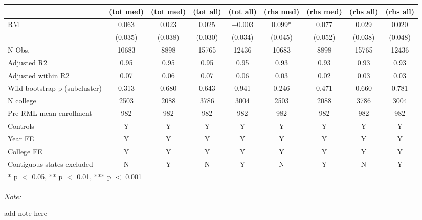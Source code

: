 \begin{table}
\centering
\begin{threeparttable}
\begin{tabular}[t]{lcccccccc}
\toprule
  & (tot med) & (tot med)  & (tot all) & (tot all)  & (rhs med) & (rhs med)  & (rhs all) & (rhs all) \\
\midrule
RM & \num{0.063} & \num{0.023} & \num{0.025} & \num{-0.003} & \num{0.099}* & \num{0.077} & \num{0.029} & \num{0.020}\\
 & (\num{0.035}) & (\num{0.038}) & (\num{0.030}) & (\num{0.034}) & (\num{0.045}) & (\num{0.052}) & (\num{0.038}) & (\num{0.048})\\
\midrule
N Obs. & \num{10683} & \num{8898} & \num{15765} & \num{12436} & \num{10683} & \num{8898} & \num{15765} & \num{12436}\\
Adjusted R2 & \num{0.95} & \num{0.95} & \num{0.95} & \num{0.95} & \num{0.93} & \num{0.93} & \num{0.93} & \num{0.93}\\
Adjusted within R2 & \num{0.07} & \num{0.06} & \num{0.07} & \num{0.06} & \num{0.03} & \num{0.02} & \num{0.03} & \num{0.03}\\
Wild bootstrap p (subcluster) & 0.313 & 0.680 & 0.643 & 0.941 & 0.246 & 0.471 & 0.660 & 0.781\\
N college & 2503 & 2088 & 3786 & 3004 & 2503 & 2088 & 3786 & 3004\\
Pre-RML mean enrollment & 982 & 982 & 982 & 982 & 982 & 982 & 982 & 982\\
Controls & Y & Y & Y & Y & Y & Y & Y & Y\\
Year FE & Y & Y & Y & Y & Y & Y & Y & Y\\
College FE & Y & Y & Y & Y & Y & Y & Y & Y\\
Contiguous states excluded & N & Y & N & Y & N & Y & N & Y\\
\bottomrule
\multicolumn{9}{l}{\rule{0pt}{1em}* p $<$ 0.05, ** p $<$ 0.01, *** p $<$ 0.001}\\
\end{tabular}
\begin{tablenotes}
\item \textit{Note: } 
\item add note here
\end{tablenotes}
\end{threeparttable}
\end{table}

